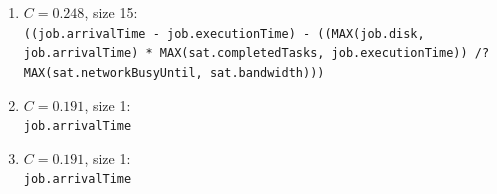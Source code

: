 \begin{enumerate}
\item $C=0.248$, size 15:\\
{\small\texttt{((job.arrivalTime - job.executionTime) - ((MAX(job.disk, job.arrivalTime) * MAX(sat.completedTasks, job.executionTime)) /? MAX(sat.networkBusyUntil, sat.bandwidth)))}}
\item $C=0.191$, size 1:\\
{\small\texttt{job.arrivalTime}}
\item $C=0.191$, size 1:\\
{\small\texttt{job.arrivalTime}}
\end{enumerate}